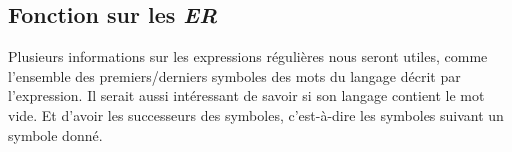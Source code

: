 


\subsection{Fonction sur les \textit{ER}}

Plusieurs informations sur les expressions régulières nous seront utiles, comme
l'ensemble des premiers/derniers symboles des mots du langage décrit par
l'expression. Il serait aussi intéressant de savoir si son langage contient le
mot vide. Et d'avoir les successeurs des symboles, c'est-à-dire les symboles
suivant un symbole donné.

\vphantom{}

